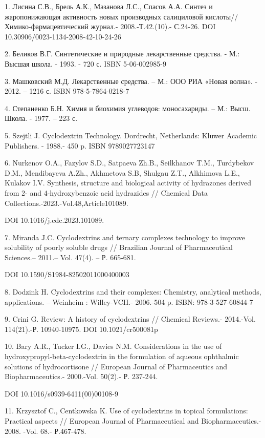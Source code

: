 \begin{noparindent}
1. Лисина С.В., Брель А.К., Мазанова Л.С., Спасов А.А. Синтез и
жаропонижающая активность новых производных салициловой
кислоты//Химико-фармацевтический журнал.- 2008.-Т.42.(10).- С.24-26. DOI
10.30906/0023-1134-2008-42-10-24-26

2. Беликов В.Г. Синтетические и природные лекарственные средства. - М.:
Высшая школа. - 1993. - 720 с. ISBN 5-06-002985-9

3. Машковский М.Д. Лекарственные средства. -- М.: ООО РИА «Новая волна».
- 2012. -- 1216 с. ISBN 978-5-7864-0218-7

4. Степаненко Б.Н. Химия и биохимия углеводов: моносахариды. -- М.:
Высш. Школа. - 1977. -- 223 с.

5. Szejtli J. Cyclodextrin Technology. Dordrecht, Netherlands: Kluwer
Academic Publishers. - 1988.- 450 p. ISBN 9789027723147

6. Nurkenov O.A., Fazylov S.D., Satpaeva Zh.B., Seilkhanov T.M.,
Turdybekov D.M., Mendibayeva A.Zh., Akhmetova S.B, Shulgau Z.T.,
Alkhimova L.E., Kulakov I.V. Synthesis, structure and biological
activity of hydrazones derived from 2- and 4-hydroxybenzoic acid
hydrazides // Chemical Data Collections.-2023.-Vol.48,Article101089.

DOI 10.1016/j.cdc.2023.101089.

7. Miranda J.C. Cyclodextrins and ternary complexes technology to
improve solubility of poorly soluble drugs // Brazilian Journal of
Pharmaceutical Sciences.-- 2011.-- Vol. 47(4). -- Р. 665-681.

DOI 10.1590/S1984-82502011000400003

8. Dodzink H. Cyclodextrins and their complexes: Chemistry, analytical
methods, applications. -- Weinheim : Willey-VCH.- 2006.-504 p. ISBN:
978-3-527-60844-7

9. Crini G. Review: A history of cyclodextrins // Chemical Reviews.-
2014.-Vol. 114(21).-Р. 10940-10975. DOI 10.1021/cr500081p

10. Bary A.R., Tucker I.G., Davies N.M. Considerations in the use of
hydroxypropyl-beta-cyclodextrin in the formulation of aqueous ophthalmic
solutions of hydrocortisone // European Journal of Pharmaceutics and
Biopharmaceutics.- 2000.-Vol. 50(2).- Р. 237-244.

DOI 10.1016/s0939-6411(00)00108-9

11. Krzysztof C., Centkowska K. Use of cyclodextrins in topical
formulations: Practical aspects // European Journal of Pharmaceutical
and Biopharmaceutics.- 2008. -Vol. 68.- Р.467-478.


\end{noparindent}
